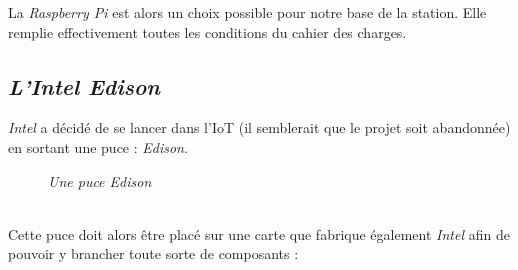 La \textit{Raspberry Pi} est alors un choix possible pour notre base de la station. Elle remplie effectivement toutes les conditions du cahier des charges.
\newpage
\subsection{\textit{L'Intel Edison}}

\textit{Intel} a décidé de se lancer dans l'IoT (il semblerait que le projet soit abandonnée) en sortant une puce : \textit{Edison}.
\begin{figure}[H]
\begin{center}
\end{center}
		\caption{ \textit{Une puce Edison}}
\end{figure}\\

Cette puce doit alors être placé sur une carte que fabrique également \textit{Intel} afin de pouvoir y brancher toute sorte de composants :\\

